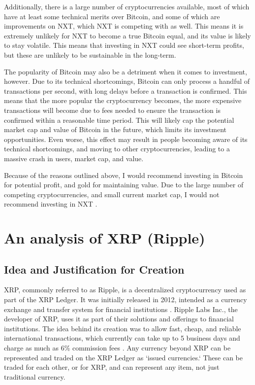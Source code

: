 \documentclass[11pt,a4paper]{article}
\begin{document}
	Additionally, there is a large number of cryptocurrencies available, most of which have at least some technical merits over Bitcoin, and some of which are improvements on NXT, which NXT is competing with as well. This means it is extremely unlikely for NXT to become a true Bitcoin equal, and its value is likely to stay volatile. This means that investing in NXT could see short-term profits, but these are unlikely to be sustainable in the long-term.
	
	The popularity of Bitcoin may also be a detriment when it comes to investment, however. Due to its technical shortcomings, Bitcoin can only process a handful of transactions per second, with long delays before a transaction is confirmed. This means that the more popular the cryptocurrency becomes, the more expensive transactions will become due to fees needed to ensure the transaction is confirmed within a reasonable time period. This will likely cap the potential market cap and value of Bitcoin in the future, which limits its investment opportunities. Even worse, this effect may result in people becoming aware of its technical shortcomings, and moving to other cryptocurrencies, leading to a massive crash in users, market cap, and value.
	
	Because of the reasons outlined above, I would recommend investing in Bitcoin for potential profit, and gold for maintaining value. Due to the large number of competing cryptocurrencies, and small current market cap, I would not recommend investing in NXT \cite{coinmarketcap}.
	
	\pagebreak
	
	\section{An analysis of XRP (Ripple)}
	
	\subsection{Idea and Justification for Creation}
	
	XRP, commonly referred to as Ripple, is a decentralized cryptocurrency used as part of the XRP Ledger. It was initially released in 2012, intended as a currency exchange and transfer system for financial institutions \cite{finder}. Ripple Labs Inc., the developer of XRP, uses it as part of their solutions and offerings to financial institutions. The idea behind its creation was to allow fast, cheap, and reliable international transactions, which currently can take up to 5 business days and charge as much as 6\% commission fees \cite{topcryptocurrencies}. Any currency beyond XRP can be represented and traded on the XRP Ledger as `issued currencies.` These can be traded for each other, or for XRP, and can represent any item, not just traditional currency.
	
\end{document}
